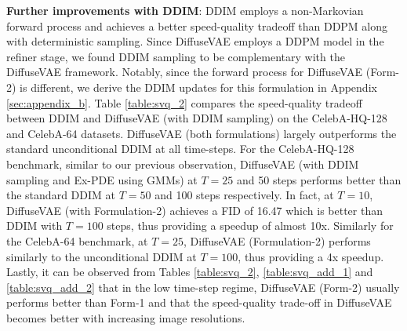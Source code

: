 \documentclass[10pt]{article} \usepackage[accepted]{tmlr}
\begin{document}
\textbf{Further improvements with DDIM}: DDIM \citep{song2021denoising} employs a non-Markovian forward process and achieves a better speed-quality tradeoff than DDPM along with deterministic sampling. Since DiffuseVAE employs a DDPM model in the refiner stage, we found DDIM sampling to be complementary with the DiffuseVAE framework. Notably, since the forward process for DiffuseVAE (Form-2) is different, we derive the DDIM updates for this formulation in Appendix \ref{sec:appendix_b}. Table \ref{table:svq_2} compares the speed-quality tradeoff between DDIM and DiffuseVAE (with DDIM sampling) on the CelebA-HQ-128 and CelebA-64 datasets. DiffuseVAE (both formulations) largely outperforms the standard unconditional DDIM at all time-steps. For the CelebA-HQ-128 benchmark, similar to our previous observation, DiffuseVAE (with DDIM sampling and Ex-PDE using GMMs) at $T=25$ and 50 steps performs better than the standard DDIM at $T=50$ and 100 steps respectively. In fact, at $T=10$, DiffuseVAE (with Formulation-2) achieves a FID of 16.47 which is better than DDIM with $T=100$ steps, thus providing a speedup of almost 10x. Similarly for the CelebA-64 benchmark, at $T=25$, DiffuseVAE (Formulation-2) performs similarly to the unconditional DDIM at $T=100$, thus providing a 4x speedup. Lastly, it can be observed from Tables \ref{table:svq_2}, \ref{table:svq_add_1} and \ref{table:svq_add_2} that in the low time-step regime, DiffuseVAE (Form-2) usually performs better than Form-1 and that the speed-quality trade-off in DiffuseVAE becomes better with increasing image resolutions.
\end{document}
